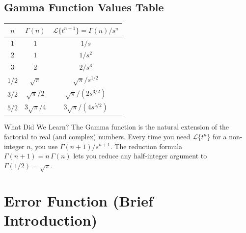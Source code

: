 \documentclass[12pt,a4paper]{article}
\begin{document}
\subsection{Gamma Function Values Table}

\begin{center}
\begin{tabular}{ccc}
\toprule
$n$ & $\Gamma(n)$ & $\mathcal{L}\{t^{n-1}\} = \Gamma(n)/s^{n}$ \\
\midrule
$1$     & $1$                      & $1/s$ \\
$2$     & $1$                      & $1/s^2$ \\
$3$     & $2$                      & $2/s^3$ \\
$1/2$   & $\sqrt{\pi}$             & $\sqrt{\pi}/s^{1/2}$ \\
$3/2$   & $\sqrt{\pi}/2$           & $\sqrt{\pi}/(2s^{3/2})$ \\
$5/2$   & $3\sqrt{\pi}/4$          & $3\sqrt{\pi}/(4s^{5/2})$ \\
\bottomrule
\end{tabular}
\end{center}

\begin{learnbox}{What Did We Learn?}
The Gamma function is the natural extension of the factorial to real (and
complex) numbers. Every time you need $\mathcal{L}\{t^n\}$ for a non-integer
$n$, you use $\Gamma(n+1)/s^{n+1}$. The reduction formula
$\Gamma(n+1) = n\,\Gamma(n)$ lets you reduce any half-integer argument to
$\Gamma(1/2) = \sqrt{\pi}$.
\end{learnbox}

\section{Error Function (Brief Introduction)}
\end{document}
